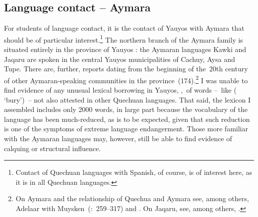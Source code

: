 \subsection{Language contact -- Aymara}
For students of language contact, it is the contact of Yauyos with Aymara that should be of particular interest.\footnote{Contact of Quechuan languages with Spanish, of course, is of interest here, as it is in all Quechuan languages.} The northern branch of the Aymara family is situated entirely in the province of Yauyos \citep[173]{Adelaar04}: the Aymaran languages Kawki and Jaqaru are spoken in the central Yauyos municipalities of Cachuy, Aysa and Tupe. There are, further, reports dating from the beginning of the~20th century of other Aymaran-speaking communities in the province~(174).\footnote{On Aymara and the relationship of Quechua and Aymara see, among others, Adelaar with Muysken~(\citeyear{Adelaar04}:~259--317) and \citet{CerroP94,CerroP00}. On Jaqaru, see, among others, \citet{Hardman66,Hardman83,Hardman00}.} I was unable to find evidence of any unusual lexical borrowing in Yauyos, \ie,~of words --~like ( ‘bury’)~-- not also attested in other Quechuan languages. That said, the lexicon I assembled includes only 2000 words, in large part because the vocabulary of the language has been much-reduced, as is to be expected, given that such reduction is one of the symptoms of extreme language endangerment. Those more familiar with the Aymaran languages may, however, still be able to find evidence of calquing or structural influence.


